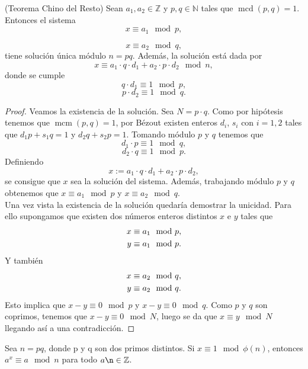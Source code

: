 \begin{teorema}
		(Teorema Chino del Resto) Sean $a_1, a_2\in \mathbb{Z}$ y $p,q \in \mathbb{N}$ tales que $\operatorname{mcd}(p,q) = 1$. Entonces el sistema
		$$
			x\equiv a_1 \mod p,
		$$\vspace*{-11mm}

		$$
			x\equiv a_2 \mod q,
		$$
	tiene solución única módulo $n=pq$. Además, la solución está dada por
	$$
		x\equiv a_1\cdot q\cdot d_1 +a_2\cdot p\cdot d_2 \mod n,
	$$
	donde se cumple
	$$
		q\cdot d_1 \equiv 1 \mod p,
	$$
	$$
		p\cdot d_2 \equiv 1 \mod q.
	$$
\end{teorema}
\begin{proof}
		Veamos la existencia de la solución. Sea $N=p\cdot q$. Como por hipótesis tenemos que $\operatorname{mcm}(p,q)=1$, por Bézout existen enteros $d_i$, $s_i$ con $i=1,2$ tales que $d_1p+s_1q=1$ y $d_2q+s_2p=1$. Tomando módulo $p$ y $q$ tenemos que 
	$$
		d_1\cdot p \equiv 1 \mod q,
	$$
	$$
		d_2\cdot q \equiv 1 \mod p.
	$$
	Definiendo 
	$$
		x :=  a_1\cdot q\cdot d_1 +a_2\cdot p\cdot d_2,
	$$
	se consigue que $x$ sea la solución del sistema. Además, trabajando módulo $p$ y $q$ obtenemos que $x\equiv a_1 \mod p$ y $x\equiv a_2 \mod q$.\\
	Una vez vista la existencia de la solución quedaría demostrar la unicidad. Para ello supongamos que existen dos números enteros distintos $x$ e $y$ tales que 
		\begin{equation}
			\begin{split}
				x \equiv a_1 \mod p,\notag\\
				y \equiv a_1 \mod p.\notag
			\end{split}
		\end{equation}
	Y también 
		\begin{equation}
			\begin{split}
				x \equiv a_2 \mod q,\notag\\
				y \equiv a_2 \mod q.\notag
			\end{split}
		\end{equation}
	Esto implica que $x-y\equiv0 \mod p$ y $x-y\equiv0 \mod q$. Como $p$ y $q$ son coprimos, tenemos que $x-y\equiv 0 \mod N$, luego se da que $x\equiv y \mod N$ llegando así a una contradicción. \qedhere
\end{proof}

\begin{proposicion}
	Sea $n = pq$, donde p y q son dos primos distintos. Si $x\equiv 1 \mod \phi(n)$, entonces $a^x\equiv a\mod n$ para todo $ a \n \in \mathbb{Z}$.
\end{proposicion}\vspace*{-5mm}

